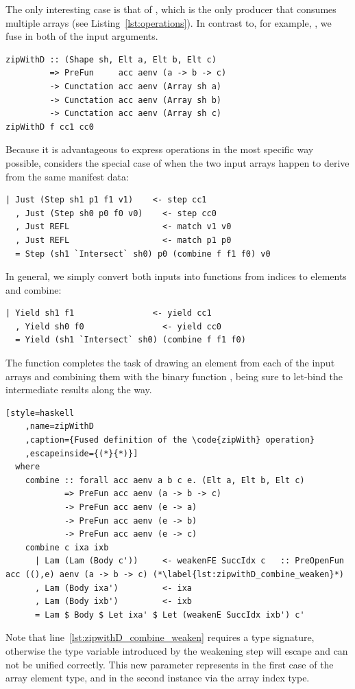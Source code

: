 The only interesting case is that of , which is the only producer
that consumes multiple arrays (see Listing~\ref{lst:operations}). In contrast
to, for example, , we fuse in both
of the input arguments.
%
\begin{lstlisting}[style=haskell
    ,name=zipWithD
    ,label=lst:zipWithD
    ,caption={[Fused definition of the \code{zipWith} operation]}]
zipWithD :: (Shape sh, Elt a, Elt b, Elt c)
         => PreFun     acc aenv (a -> b -> c)
         -> Cunctation acc aenv (Array sh a)
         -> Cunctation acc aenv (Array sh b)
         -> Cunctation acc aenv (Array sh c)
zipWithD f cc1 cc0
\end{lstlisting}
%
Because it is advantageous to express operations in the most specific way
possible,  considers the special case of when the two input arrays
happen to derive from the same manifest data:
%
\begin{lstlisting}[style=haskell,name=zipWithD]
  | Just (Step sh1 p1 f1 v1)    <- step cc1
  , Just (Step sh0 p0 f0 v0)    <- step cc0
  , Just REFL                   <- match v1 v0
  , Just REFL                   <- match p1 p0
  = Step (sh1 `Intersect` sh0) p0 (combine f f1 f0) v0
\end{lstlisting}
%
In general, we simply convert both inputs into functions from indices to
elements and combine:
%
\begin{lstlisting}[style=haskell,name=zipWithD]
  | Yield sh1 f1                <- yield cc1
  , Yield sh0 f0                <- yield cc0
  = Yield (sh1 `Intersect` sh0) (combine f f1 f0)
\end{lstlisting}
%
The function  completes the task of drawing an element from each
of the input arrays and combining them with the binary function , being
sure to let-bind the intermediate results along the way.
%
\begin{lstlisting}[style=haskell
    ,name=zipWithD
    ,caption={Fused definition of the \code{zipWith} operation}
    ,escapeinside={(*}{*)}]
  where
    combine :: forall acc aenv a b c e. (Elt a, Elt b, Elt c)
            => PreFun acc aenv (a -> b -> c)
            -> PreFun acc aenv (e -> a)
            -> PreFun acc aenv (e -> b)
            -> PreFun acc aenv (e -> c)
    combine c ixa ixb
      | Lam (Lam (Body c'))     <- weakenFE SuccIdx c   :: PreOpenFun acc ((),e) aenv (a -> b -> c) (*\label{lst:zipwithD_combine_weaken}*)
      , Lam (Body ixa')         <- ixa
      , Lam (Body ixb')         <- ixb
      = Lam $ Body $ Let ixa' $ Let (weakenE SuccIdx ixb') c'
\end{lstlisting}
%
Note that line~\ref{lst:zipwithD_combine_weaken} requires a type signature,
otherwise the type variable  introduced by the weakening step will
escape and can not be unified correctly. This new parameter  represents
in the first case of  the array element type, and in the second
instance via  the array index type.


